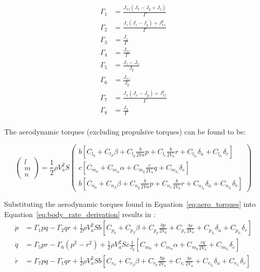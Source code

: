 \begin{equation}
\begin{split}
\Gamma_1&=\frac{J_{xz}(J_x-J_y+J_z)}{\Gamma}\\
\Gamma_2&=\frac{J_z(J_z-J_y)+J_{xz}^2}{\Gamma}\\
\Gamma_3&=\frac{J_z}{\Gamma}\\
\Gamma_4&=\frac{J_{xz}}{\Gamma}\\
\Gamma_5&=\frac{J_z-J_x}{J_y}\\
\Gamma_6&=\frac{J_{xz}}{J_y}\\
\Gamma_7&=\frac{J_x(J_x-J_y)+J_{xz}^2}{\Gamma}\\
\Gamma_8&=\frac{J_x}{\Gamma}\\
\end{split}
\end{equation}

The aerodynamic torques (excluding propulsive torques) can be found to be:

\begin{equation}\label{eq:aero_torques}
\begin{pmatrix}
  l\\
  m\\
  n
 \end{pmatrix}
 =
 \frac{1}{2}\rho V_a^2S
 \begin{pmatrix}
  b\left[C_{l_0}+C_{l_\beta}\beta+C_{l_p}\frac{b}{2Va}p+C_{l_r}\frac{b}{2V_a}r+C_{l_{\delta_a}}\delta_a+C_{l_{\delta_r}}\delta_r\right]\\
  c\left[C_{m_0}+C_{m_\alpha}\alpha+C_{m_q}\frac{c}{2V_a}q+C_{m_{\delta_e}}\delta_e\right]\\
  b\left[C_{n_0}+C_{n_\beta}\beta+C_{n_p}\frac{b}{2Va}p+C_{n_r}\frac{b}{2V_a}r+C_{n_{\delta_a}}\delta_a+C_{n_{\delta_r}}\delta_r\right]
 \end{pmatrix}
\end{equation}

Substituting the aerodynamic torques found in Equation~\ref{eq:aero_torques} into Equation~\ref{eq:body_rate_derivation} results in \cite{beard2012small}:
\begin{equation}\label{eq:body_rate_equations}
\begin{split}
 \dot{p}&=\Gamma_1pq-\Gamma_2qr+\frac{1}{2}\rho V_a^2Sb\left[C_{p_0}+C_{p_\beta}\beta+C_{p_p}\frac{bp}{2V_a}+C_{p_r}\frac{br}{2V_a}+C_{p_{\delta_a}}\delta_a+C_{p_{\delta_r}}\delta_r\right]\\
 \dot{q}&=\Gamma_5pr-\Gamma_6(p^2-r^2)+\frac{1}{2}\rho V_a^2Sc\frac{1}{J_y}\left[C_{m_0}+C_{m_\alpha}\alpha+C_{m_q}\frac{cq}{2V_a}+C_{m_{\delta_e}}\delta_e\right]\\
 \dot{r}&=\Gamma_7pq-\Gamma_1qr+\frac{1}{2}\rho V_a^2Sb\left[C_{r_0}+C_{r_\beta}\beta+C_{r_p}\frac{bp}{2V_a}+C_{r_r}\frac{br}{2V_a}+C_{r_{\delta_a}}\delta_a+C_{r_{\delta_r}}\delta_r\right]
\end{split} 
\end{equation}

